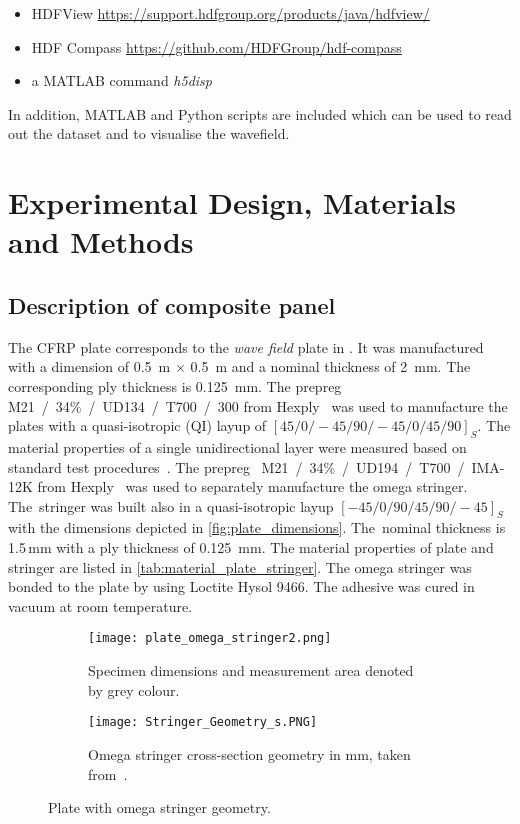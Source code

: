 \documentclass[times,final]{elsarticle}
\begin{document}
\begin{itemize} 
\item HDFView \url{https://support.hdfgroup.org/products/java/hdfview/}
\item HDF Compass \url{https://github.com/HDFGroup/hdf-compass} 
\item a MATLAB command \textit{h5disp}
\end{itemize}

In addition, MATLAB and Python scripts are included which can be used to read out the dataset and to visualise the wavefield. 

\section{Experimental Design, Materials and Methods}

\subsection{Description of composite panel}

The CFRP plate corresponds to the \textit{wave field} plate in \cite{Moll2020}. It was manufactured  with a  dimension of \SI{0.5}{\meter} $\times$ \SI{0.5}{\meter} and a nominal thickness of \SI{2}{\milli\meter}. The
corresponding ply thickness is \SI{0.125}{\milli\meter}. The prepreg  \mbox{M21~/~34\%~/~UD134~/~T700~/~300} from Hexply~\textsuperscript{\textregistered} was used to manufacture the plates with a quasi-isotropic (QI) layup of \mbox{$[45/0/-45/90/-45/0/45/90]_S$}. 
The material properties of a single unidirectional layer were measured based on  standard test procedures~\cite{moll_open_2018}. 
The prepreg \mbox{~M21~/~34\%~/~UD194~/~T700~/~IMA-12K} from Hexply~\textsuperscript{\textregistered} was used to separately manufacture the omega stringer. 
The~stringer was  built also in a quasi-isotropic layup \mbox{$[-45/0/90/45/90/-45]_S$} with the dimensions depicted in \autoref{fig:plate_dimensions}. The~nominal thickness is 1.5\,mm with a ply thickness of \SI{0.125}{\milli\meter}. The material properties of plate and stringer are listed in \autoref{tab:material_plate_stringer}. 
The omega stringer was bonded to the plate by using Loctite Hysol 9466. The adhesive was cured in vacuum at room temperature.

\begin{figure} [h!]
	\centering
	\begin{subfigure}[b]{\textwidth}
	\centering
		\texttt{[image: plate\_omega\_stringer2.png]}
		\caption{Specimen dimensions and measurement area denoted by grey colour.}
		\label{fig:sldv_area}
	\end{subfigure}
	\begin{subfigure}[b]{\textwidth}
	\centering
	\texttt{[image: Stringer\_Geometry\_s.PNG]}
	\caption{Omega stringer cross-section geometry in \si{\milli\meter}, taken from~\cite{Moll2020}.}
	\label{fig:stringer_crosssection}
	\end{subfigure}
	\caption{Plate with omega stringer geometry.}
	\label{fig:plate_dimensions}
\end{figure}
\end{document}
